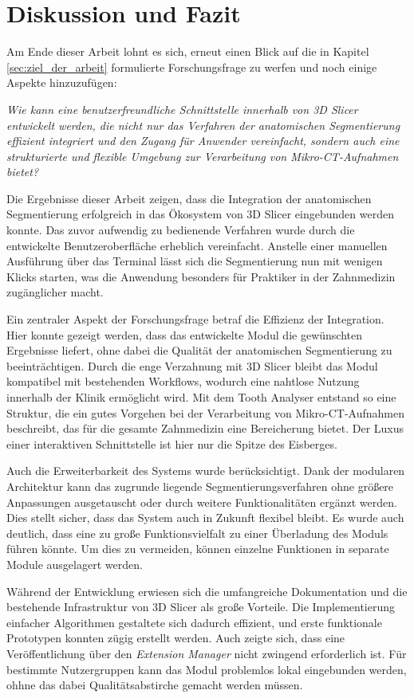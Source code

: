 \chapter{Diskussion und Fazit}
\label{chap:diskussion} Am Ende dieser Arbeit lohnt es sich, erneut einen Blick auf
die in Kapitel \ref{sec:ziel_der_arbeit} formulierte Forschungsfrage zu werfen und
noch einige Aspekte hinzuzufügen:

\textit{Wie kann eine benutzerfreundliche Schnittstelle innerhalb von 3D Slicer
entwickelt werden, die nicht nur das Verfahren der anatomischen Segmentierung effizient
integriert und den Zugang für Anwender vereinfacht, sondern auch eine
strukturierte und flexible Umgebung zur Verarbeitung von Mikro-CT-Aufnahmen
bietet?}

Die Ergebnisse dieser Arbeit zeigen, dass die Integration der anatomischen
Segmentierung erfolgreich in das Ökosystem von 3D Slicer eingebunden werden
konnte. Das zuvor aufwendig zu bedienende Verfahren wurde durch die entwickelte Benutzeroberfläche
erheblich vereinfacht. Anstelle einer manuellen Ausführung über das Terminal
lässt sich die Segmentierung nun mit wenigen Klicks starten, was die Anwendung besonders
für Praktiker in der Zahnmedizin zugänglicher macht.

Ein zentraler Aspekt der Forschungsfrage betraf die Effizienz der Integration.
Hier konnte gezeigt werden, dass das entwickelte Modul die gewünschten Ergebnisse
liefert, ohne dabei die Qualität der anatomischen Segmentierung zu
beeinträchtigen. Durch die enge Verzahnung mit 3D Slicer bleibt das Modul kompatibel
mit bestehenden Workflows, wodurch eine nahtlose Nutzung innerhalb der Klinik
ermöglicht wird. Mit dem Tooth Analyser entstand so eine Struktur, die ein gutes
Vorgehen bei der Verarbeitung von Mikro-CT-Aufnahmen beschreibt, das für die gesamte
Zahnmedizin eine Bereicherung bietet. Der Luxus einer interaktiven Schnittstelle
ist hier nur die Spitze des Eisberges.

Auch die Erweiterbarkeit des Systems wurde berücksichtigt. Dank der modularen Architektur
kann das zugrunde liegende Segmentierungsverfahren ohne größere Anpassungen ausgetauscht
oder durch weitere Funktionalitäten ergänzt werden. Dies stellt sicher, dass das
System auch in Zukunft flexibel bleibt. Es wurde auch deutlich, dass eine zu große
Funktionsvielfalt zu einer Überladung des Moduls führen könnte. Um dies zu
vermeiden, können einzelne Funktionen in separate Module ausgelagert werden.

Während der Entwicklung erwiesen sich die umfangreiche Dokumentation und die bestehende
Infrastruktur von 3D Slicer als große Vorteile. Die Implementierung einfacher
Algorithmen gestaltete sich dadurch effizient, und erste funktionale Prototypen konnten
zügig erstellt werden. Auch zeigte sich, dass eine Veröffentlichung über den \textit{Extension
Manager} nicht zwingend erforderlich ist. Für bestimmte Nutzergruppen kann das Modul
problemlos lokal eingebunden werden, ohhne das dabei Qualitätsabstirche gemacht
werden müssen.

